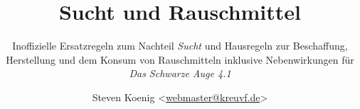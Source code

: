 
\label{img-title}
~ %
\clearpage
\pagebreak

\label{img-title-grey}
\title{Sucht und Rauschmittel}
\subtitle{Inoffizielle Ersatzregeln zum Nachteil \emph{Sucht} und Hausregeln zur Beschaffung, Herstellung und dem Konsum von Rauschmitteln inklusive Nebenwirkungen für \emph{Das Schwarze Auge 4.1}}
\author{Steven Koenig <\href{mailto:webmaster@kreuvf.de}{webmaster@kreuvf.de}>}
\date{\gitAuthorDate{}}
\maketitle

